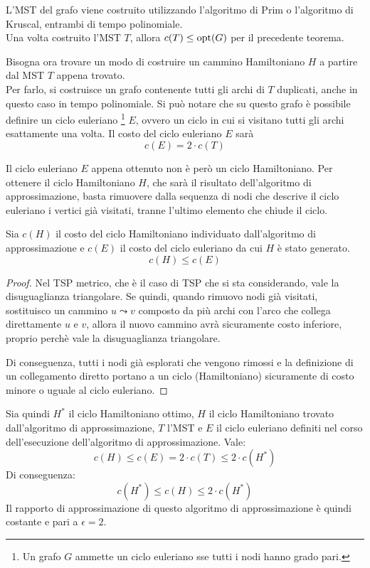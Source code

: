 L'MST del grafo viene costruito utilizzando l'algoritmo di Prim o
l'algoritmo di Kruscal, entrambi di tempo polinomiale.\\
Una volta costruito l'MST $T$, allora $c(T) \le \textnormal{opt}(G)$ per il precedente
teorema.

Bisogna ora trovare un modo di costruire un cammino Hamiltoniano $H$ a partire
dal MST $T$ appena trovato.\\
Per farlo, si costruisce un grafo contenente tutti gli archi di $T$ duplicati,
anche in questo caso in tempo polinomiale.
Si può notare che su questo grafo è possibile definire un ciclo euleriano
\footnote{Un grafo $G$ ammette un ciclo euleriano sse tutti i nodi
hanno grado pari.} $E$, ovvero un ciclo in cui si visitano tutti gli archi
esattamente una volta. Il costo del ciclo euleriano $E$ sarà
\[
    c(E) = 2 \cdot c(T)
\]

Il ciclo euleriano $E$ appena ottenuto non è però un ciclo Hamiltoniano.
Per ottenere il ciclo Hamiltoniano $H$, che sarà il risultato dell'algoritmo
di approssimazione, basta rimuovere dalla sequenza di nodi che descrive il
ciclo euleriano i vertici già visitati, tranne l'ultimo elemento che chiude
il ciclo.

\begin{thm}
    Sia $c(H)$ il costo del ciclo Hamiltoniano individuato dall'algoritmo
    di approssimazione e $c(E)$ il costo del ciclo euleriano da cui $H$ è
    stato generato.
    \[
        c(H) \le c(E)
    \]
\end{thm}
\begin{proof}
    Nel TSP metrico, che è il caso di TSP che si sta considerando,
    vale la disuguaglianza triangolare.
    Se quindi, quando rimuovo nodi già visitati, sostituisco un cammino
    $u \leadsto v$ composto da più archi con l'arco che collega direttamente
    $u$ e $v$, allora il nuovo cammino avrà sicuramente costo inferiore,
    proprio perchè vale la disuguaglianza triangolare.

    Di conseguenza, tutti i nodi già esplorati che vengono rimossi e la
    definizione di un collegamento diretto portano a un ciclo (Hamiltoniano)
    sicuramente di costo minore o uguale al ciclo euleriano.
\end{proof}

Sia quindi $H^*$ il ciclo Hamiltoniano ottimo, $H$ il ciclo Hamiltoniano
trovato dall'algoritmo di approssimazione, $T$ l'MST e $E$ il ciclo euleriano
definiti nel corso dell'esecuzione dell'algoritmo di approssimazione. Vale:
\[
    c(H) \le c(E) = 2 \cdot c(T) \le 2 \cdot c(H^*)
\]
Di conseguenza:
\[
    c(H^*) \le c(H) \le 2 \cdot c(H^*)
\]
Il rapporto di approssimazione di questo algoritmo di approssimazione è
quindi costante e pari a $\epsilon = 2$.

